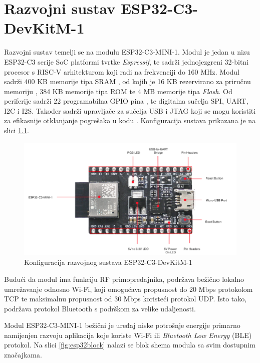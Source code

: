 \chapter{Razvojni sustav ESP32-C3-DevKitM-1}

Razvojni sustav temelji se na modulu ESP32-C3-MINI-1. Modul je jedan u nizu ESP32-­C3 serije SoC  platformi tvrtke \textit{Espressif}, te sadrži jednojezgreni 32-bitni procesor s RISC-V arhitekturom koji radi na frekvenciji do 160 MHz. Modul sadrži 400 KB memorije tipa SRAM , od kojih je 16 KB rezervirano za priručnu memoriju , 384 KB memorije tipa ROM  te 4 MB memorije tipa \textit{Flash}. Od periferije sadrži 22 programabilna GPIO pina , te digitalna sučelja SPI, UART, I2C i I2S. Također sadrži upravljače za sučelja USB i JTAG koji se mogu koristiti za efikasnije otklanjanje pogrešaka u kodu . Konfiguracija sustava prikazana je na slici \ref{fig:esp32}. \cite{esp32manual}

\begin{figure}[ht]
	\centering
	\includegraphics[scale=0.6]{imgs/esp32}
	\caption{Konfiguracija razvojnog sustava ESP32-C3-DevKitM-1 \cite{espressif}}
	\label{fig:esp32}
\end{figure}

Budući da modul ima funkciju RF  primopredajnika, podržava bežično lokalno umrežavanje odnosno Wi-Fi, koji omogućava propusnost do 20 Mbps protokolom TCP te maksimalnu propusnost od 30 Mbps koristeći protokol UDP. Isto tako, podržava protokol Bluetooth s podrškom za velike udaljenosti. 

Modul ESP32-C3-MINI-1 bežični je uređaj niske potrošnje energije  primarno namijenjen razvoju aplikacija koje koriste Wi-Fi ili \textit{Bluetooth Low Energy} (BLE) protokol. Na slici \ref{fig:esp32block} nalazi se blok shema modula sa svim dostupnim značajkama. 


